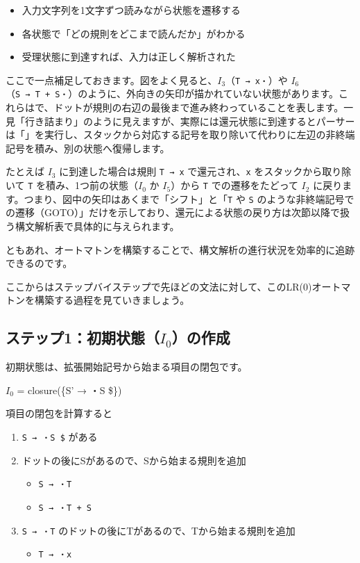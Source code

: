 
\begin{itemize}
\item
  入力文字列を1文字ずつ読みながら状態を遷移する
\item
  各状態で「どの規則をどこまで読んだか」がわかる
\item
  受理状態に到達すれば、入力は正しく解析された
\end{itemize}

ここで一点補足しておきます。図をよく見ると、\(I_3\)（\texttt{T\ →\ x・}）や
\(I_6\)（\texttt{S\ →\ T\ +\ S・}）のように、外向きの矢印が描かれていない状態があります。これらはで、ドットが規則の右辺の最後まで進み終わっていることを表します。一見「行き詰まり」のように見えますが、実際には還元状態に到達するとパーサーは「」を実行し、スタックから対応する記号を取り除いて代わりに左辺の非終端記号を積み、別の状態へ復帰します。

たとえば \(I_3\) に到達した場合は規則 \texttt{T\ →\ x}
で還元され、\texttt{x} をスタックから取り除いて \texttt{T}
を積み、1つ前の状態（\(I_0\) か \(I_5\)）から \texttt{T}
での遷移をたどって \(I_2\)
に戻ります。つまり、図中の矢印はあくまで「シフト」と「\texttt{T} や
\texttt{S}
のような非終端記号での遷移（GOTO）」だけを示しており、還元による状態の戻り方は次節以降で扱う構文解析表で具体的に与えられます。

ともあれ、オートマトンを構築することで、構文解析の進行状況を効率的に追跡できるのです。

ここからはステップバイステップで先ほどの文法に対して、このLR(0)オートマトンを構築する過程を見ていきましょう。

\subsection{ステップ1：初期状態（$I_0$）の作成}

初期状態は、拡張開始記号から始まる項目の閉包です。

\(I_0\) = closure(\{S' → ・S \$\})

項目の閉包を計算すると

\begin{enumerate}
\item
  \texttt{S\textquotesingle{}\ →\ ・S\ \$} がある
\item
  ドットの後にSがあるので、Sから始まる規則を追加

\begin{itemize}
\item
  \texttt{S\ →\ ・T}
\item
  \texttt{S\ →\ ・T\ +\ S}
\end{itemize}

\item
  \texttt{S\ →\ ・T} のドットの後にTがあるので、Tから始まる規則を追加

\begin{itemize}
\item
  \texttt{T\ →\ ・x}
\end{itemize}
\end{enumerate}

